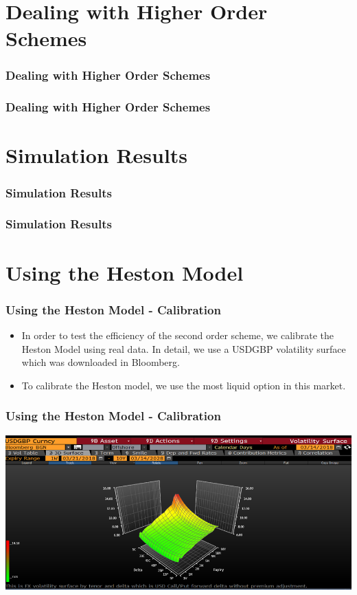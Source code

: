 \documentclass[12pt]{beamer}
\begin{document}
\section{Dealing with Higher Order Schemes}
\frame{\tableofcontents[currentsection]}

\begin{frame}
\frametitle{Dealing with Higher Order Schemes}
\end{frame}

\begin{frame}
\frametitle{Dealing with Higher Order Schemes}
\end{frame}





\section{Simulation Results}
\frame{\tableofcontents[currentsection]}

\begin{frame}
\frametitle{Simulation Results}
\end{frame}

\begin{frame}
\frametitle{Simulation Results}
\end{frame}



\section{Using the Heston Model}
\frame{\tableofcontents[currentsection]}

\begin{frame}
\frametitle{Using the Heston Model - Calibration}
\begin{itemize}
  \item In order to test the efficiency of the second order scheme, we calibrate the Heston Model using real data. In detail, we use a USDGBP volatility surface which was downloaded in Bloomberg.
  \item To calibrate the Heston model, we use the most liquid option in this market.
\end{itemize}
\end{frame}

\begin{frame}
\frametitle{Using the Heston Model - Calibration}
\centering
\includegraphics[width=\textwidth]{bloomberg1.png}
\end{frame}
\end{document}
